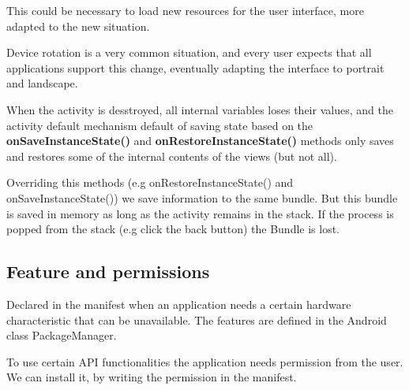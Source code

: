 This could be necessary to load new resources for the user interface, more 
adapted to the new situation. 

Device rotation is a very common situation, and every user expects that all applications support
this change, eventually adapting the interface to portrait and landscape. 

When the activity is desstroyed, all internal variables loses their values, and 
the activity default mechanism default of saving state based on the \textbf{onSaveInstanceState()}
and \textbf{onRestoreInstanceState()} methods only saves and restores some of the internal
contents of the views (but not all).

Overriding this methods (e.g onRestoreInstanceState() and onSaveInstanceState()) 
we save information to the same bundle. But this bundle is saved in memory as long 
as the activity remains in the stack. If the process is popped from the stack (e.g 
click the back button) the Bundle is lost. 

\subsection{Feature and permissions}
Declared in the manifest when an application needs a certain hardware characteristic 
that can be unavailable. The features are defined in the Android class PackageManager. 

To use certain API functionalities the application needs permission from the user.
We can install it, by writing the permission in the manifest. 












